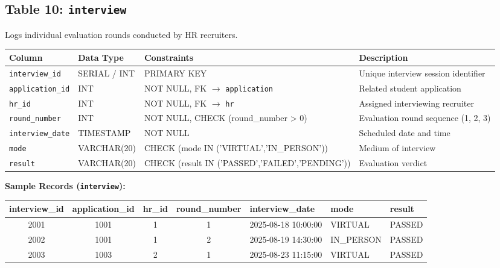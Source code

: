 \documentclass[11pt,a4paper]{article}
\begin{document}
\subsection{Table 10: \texttt{interview}}
Logs individual evaluation rounds conducted by HR recruiters.

\begin{table}[H]
    \centering
    \footnotesize
    \begin{tabularx}{\textwidth}{l l l X}
        \toprule
        \textbf{Column} & \textbf{Data Type} & \textbf{Constraints} & \textbf{Description} \\
        \midrule
        \texttt{interview\_id} & SERIAL / INT & PRIMARY KEY & Unique interview session identifier \\
        \texttt{application\_id} & INT & NOT NULL, FK \(\to\) \texttt{application} & Related student application \\
        \texttt{hr\_id} & INT & NOT NULL, FK \(\to\) \texttt{hr} & Assigned interviewing recruiter \\
        \texttt{round\_number} & INT & NOT NULL, CHECK (round\_number > 0) & Evaluation round sequence (1, 2, 3) \\
        \texttt{interview\_date} & TIMESTAMP & NOT NULL & Scheduled date and time \\
        \texttt{mode} & VARCHAR(20) & CHECK (mode IN ('VIRTUAL','IN\_PERSON')) & Medium of interview \\
        \texttt{result} & VARCHAR(20) & CHECK (result IN ('PASSED','FAILED','PENDING')) & Evaluation verdict \\
        \bottomrule
    \end{tabularx}
\end{table}

\textbf{Sample Records (\texttt{interview}):}
\begin{table}[H]
    \centering
    \scriptsize
    \begin{tabularx}{\textwidth}{c c c c l l l}
        \toprule
        \textbf{interview\_id} & \textbf{application\_id} & \textbf{hr\_id} & \textbf{round\_number} & \textbf{interview\_date} & \textbf{mode} & \textbf{result} \\
        \midrule
        2001 & 1001 & 1 & 1 & 2025-08-18 10:00:00 & VIRTUAL & PASSED \\
        2002 & 1001 & 1 & 2 & 2025-08-19 14:30:00 & IN\_PERSON & PASSED \\
        2003 & 1003 & 2 & 1 & 2025-08-23 11:15:00 & VIRTUAL & PASSED \\
        \bottomrule
    \end{tabularx}
\end{table}
\end{document}
